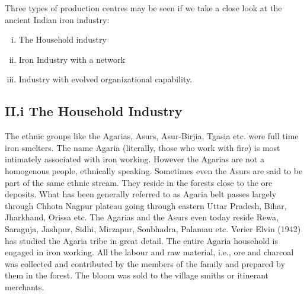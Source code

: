 \vspace{-.15cm}

Three types of production centres may be seen if we take a close look at the ancient Indian iron industry:

\vspace{-.3cm}

\begin{enumerate}[i.]
\item The Household industry
\item Iron Industry with a network
\item Industry with evolved organizational capability.
\end{enumerate}

\vspace{-.3cm}

\subsection*{II.i The Household Industry}\label{subsection-1}

\vspace{-.2cm}

The ethnic groups like the Agarias, Asurs, Asur-Birjia, Tgasia etc. were full time iron smelters.  The name Agaria (literally, those who work with fire) is most intimately associated with iron working.  However the Agarias are not a homogenous people, ethnically speaking.  Sometimes even the Asurs are said to be part of the same ethnic stream.  They reside in the forests close to the ore deposits. What has been generally referred to as Agaria belt passes largely through Chhota Nagpur plateau going through eastern Uttar Pradesh, Bihar, Jharkhand, Orissa etc. The Agarias and the Asurs even today reside Rewa, Saraguja, Jashpur, Sidhi, Mirzapur, Sonbhadra, Palamau etc. Verier Elvin (1942) has studied the Agaria tribe in great detail. The entire Agaria household is engaged in iron working. All the labour and raw material, i.e., ore and charcoal was collected and contributed by the members of the family and prepared by them in the forest. The bloom was sold to the village smiths or itinerant merchants. 

